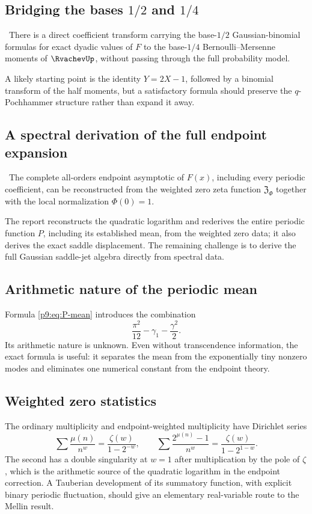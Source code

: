 \documentclass[11pt]{article}
\numberwithin{equation}{section}
\theoremstyle{definition}
\theoremstyle{remark}
\begin{document}
\subsection{Bridging the bases $1/2$ and $1/4$}
\begin{conjecture}
\statusC\ There is a direct coefficient transform carrying the base-$1/2$ Gaussian-binomial
formulas for exact dyadic values of $F$ to the base-$1/4$ Bernoulli--Mersenne moments of
$\RvachevUp$, without passing through the full probability model.
\end{conjecture}
A likely starting point is the identity $Y=2X-1$, followed by a binomial transform of the
half moments, but a satisfactory formula should preserve the $q$-Pochhammer structure
rather than expand it away.

\subsection{A spectral derivation of the full endpoint expansion}
\begin{conjecture}
\statusC\ The complete all-orders endpoint asymptotic of $F(x)$, including every periodic
coefficient, can be reconstructed from the weighted zero zeta function
$\mathfrak Z_\Phi$ together with the local normalization $\Phi(0)=1$.
\end{conjecture}
The report reconstructs the quadratic logarithm and rederives the entire periodic function
$P$, including its established mean, from the weighted zero data; it also derives the exact
saddle displacement.  The remaining challenge is to derive the full
Gaussian saddle-jet algebra directly from spectral data.

\subsection{Arithmetic nature of the periodic mean}
Formula \eqref{p9:eq:P-mean} introduces the combination
\[
 \frac{\pi^2}{12}-\gamma_1-\frac{\gamma^2}{2}.
\]
Its arithmetic nature is unknown.  Even without transcendence information, the exact
formula is useful: it separates the mean from the exponentially tiny nonzero modes and
eliminates one numerical constant from the endpoint theory.

\subsection{Weighted zero statistics}
The ordinary multiplicity and endpoint-weighted multiplicity have Dirichlet series
\[
 \sum\frac{\mu(n)}{n^w}=\frac{\zeta(w)}{1-2^{-w}},
 \qquad
 \sum\frac{2^{\mu(n)}-1}{n^w}=\frac{\zeta(w)}{1-2^{1-w}}.
\]
The second has a double singularity at $w=1$ after multiplication by the pole of $\zeta$,
which is the arithmetic source of the quadratic logarithm in the endpoint correction.
A Tauberian development of its summatory function, with explicit binary periodic
fluctuation, should give an elementary real-variable route to the Mellin result.
\end{document}
